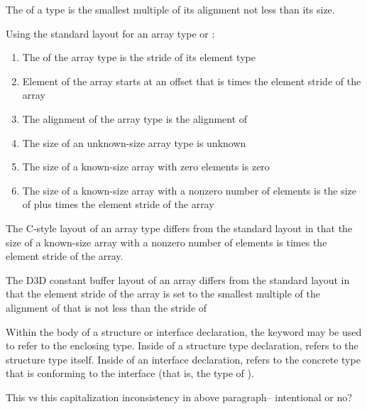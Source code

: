
The  of a type is the smallest multiple of its alignment not less than its size.

Using the standard layout for an array type  or :

\begin{enumerate}
  \item{The  of the array type is the stride of its element type }
  \item{Element  of the array starts at an offset that is  times the element stride of the array}
  \item{The alignment of the array type is the alignment of }
  \item{The size of an unknown-size array type is unknown}
  \item{The size of a known-size array with zero elements is zero}
  \item{The size of a known-size array with a nonzero number  of elements is the size of  plus  times the element stride of the array}
\end{enumerate}


The C-style layout of an array type differs from the standard layout in that the size of a known-size array with a nonzero number  of elements is  times the element stride of the array.


The D3D constant buffer layout of an array differs from the standard layout in that the element stride of the array is set to the smallest multiple of the alignment of  that is not less than the stride of 


Within the body of a structure or interface declaration, the keyword  may be used to refer to the enclosing type.
Inside of a structure type declaration,  refers to the structure type itself.
Inside of an interface declaration,  refers to the concrete type that is conforming to the interface (that is, the type of ).
\begin{TODO}
This vs this capitalization inconsistency in above paragraph-- intentional or no?
\end{TODO}

